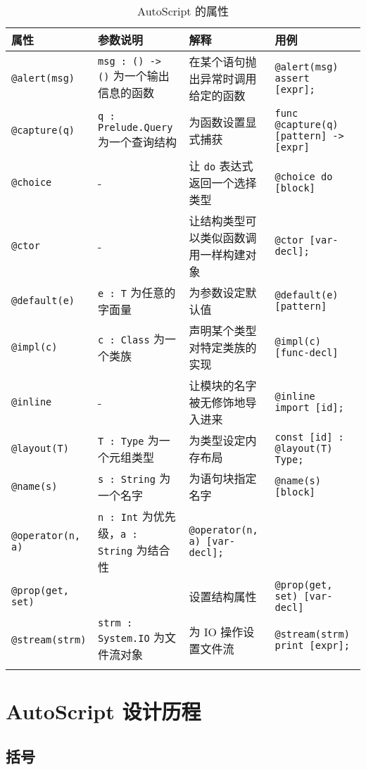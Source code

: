 \begin{longtable}{l p{4cm} p{3cm} p{4cm}} \hline
		属性 & 参数说明 & 解释 & 用例 \\\hline
		\lstinline!@alert(msg)! & \lstinline!msg : () -> ()! 为一个输出信息的函数 & 在某个语句抛出异常时调用给定的函数 & \lstinline!@alert(msg) assert [expr];! \\\hline
		\lstinline!@capture(q)! & \lstinline!q : Prelude.Query! 为一个查询结构 & 为函数设置显式捕获 & \lstinline!func @capture(q) [pattern] -> [expr]! \\\hline
		\lstinline!@choice! & - & 让 \lstinline!do! 表达式返回一个选择类型 & \lstinline!@choice do [block]! \\\hline
		\lstinline!@ctor! & - & 让结构类型可以类似函数调用一样构建对象 & \lstinline!@ctor [var-decl];! \\\hline
		\lstinline!@default(e)! & \lstinline!e : T! 为任意的字面量 & 为参数设定默认值 & \lstinline!@default(e) [pattern]! \\\hline
		\lstinline!@impl(c)! & \lstinline!c : Class! 为一个类族 & 声明某个类型对特定类族的实现 & \lstinline!@impl(c) [func-decl]! \\\hline
		\lstinline!@inline! & - & 让模块的名字被无修饰地导入进来 & \lstinline!@inline import [id];! \\\hline
		\lstinline!@layout(T)! & \lstinline!T : Type! 为一个元组类型 & 为类型设定内存布局 & \lstinline!const [id] : @layout(T) Type;! \\\hline
		\lstinline!@name(s)! & \lstinline!s : String! 为一个名字 & 为语句块指定名字 & \lstinline!@name(s) [block]!  \\\hline
		\lstinline!@operator(n, a)! & \lstinline!n : Int! 为优先级，\lstinline!a : String! 为结合性 & \lstinline!@operator(n, a) [var-decl];! \\\hline
		\lstinline!@prop(get, set)! & \lstinline!! & 设置结构属性 & \lstinline!@prop(get, set) [var-decl]! \\\hline
		\lstinline!@stream(strm)! & \lstinline!strm : System.IO! 为文件流对象 & 为 IO 操作设置文件流 & \lstinline!@stream(strm) print [expr];! \\\hline
	\caption{AutoScript 的属性}
	\label{tab:attributes}
\end{longtable}


\chapter{AutoScript 设计历程}

\section{括号}

